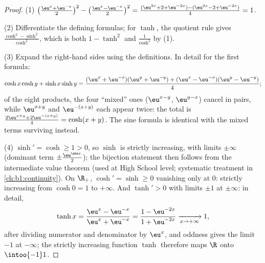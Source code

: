 \begin{proof}
(1) $\bigl(\frac{\eu^x + \eu^{-x}}{2}\bigr)^2 - \bigl(\frac{\eu^x -
\eu^{-x}}{2}\bigr)^2 = \frac{(\eu^{2x} + 2 + \eu^{-2x}) - (\eu^{2x} -
2 + \eu^{-2x})}{4} = 1$.

(2) Differentiate the defining formulas; for $\tanh$, the quotient
rule gives $\frac{\cosh^2 - \sinh^2}{\cosh^2}$, which is both
$1 - \tanh^2$ and $\frac{1}{\cosh^2}$ by (1).

(3) Expand the right-hand sides using the definitions. In detail
for the first formula:
\[
\cosh x\cosh y + \sinh x\sinh y
= \frac{(\eu^x + \eu^{-x})(\eu^y + \eu^{-y})
+ (\eu^x - \eu^{-x})(\eu^y - \eu^{-y})}{4} ;
\]
of the eight products, the four ``mixed'' ones
($\eu^{x-y}$, $\eu^{y-x}$) cancel in pairs, while
$\eu^{x+y}$ and $\eu^{-(x+y)}$ each appear twice:
the total is $\frac{2\eu^{x+y} + 2\eu^{-(x+y)}}{4} = \cosh(x+y)$.
The sine formula is identical with the mixed terms surviving
instead.

(4) $\sinh' = \cosh \geq 1 > 0$, so $\sinh$ is strictly increasing,
with limits $\pm\infty$ (dominant term $\pm\frac{\eu^{\abs
x}}{2}$); the bijection statement then follows from the intermediate
value theorem (used at High School level; systematic treatment in
\cref{ch:b1:continuity}). On $\R_+$, $\cosh' = \sinh \geq 0$
vanishing only at $0$: strictly increasing from $\cosh 0 = 1$ to
$+\infty$. And $\tanh' > 0$ with limits $\pm 1$ at $\pm\infty$: in
detail,
\[
\tanh x = \frac{\eu^x - \eu^{-x}}{\eu^x + \eu^{-x}}
= \frac{1 - \eu^{-2x}}{1 + \eu^{-2x}}
\xrightarrow[x \to +\infty]{} 1 ,
\]
after dividing numerator and denominator by $\eu^x$, and oddness
gives the limit $-1$ at $-\infty$; the strictly increasing
function $\tanh$ therefore maps $\R$ onto $\intoo{-1}1$.
\end{proof}

